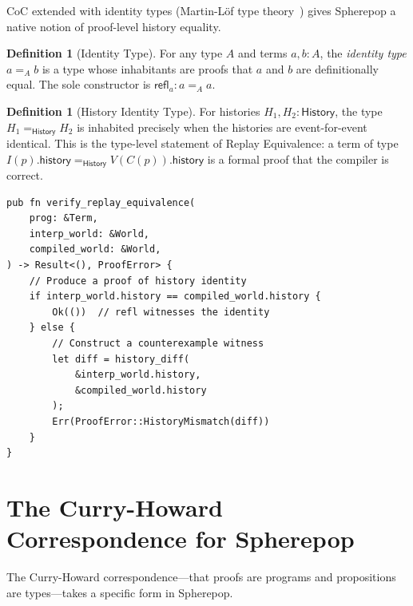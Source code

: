 \documentclass[12pt, a4paper, openany]{book}
\theoremstyle{plain}
\theoremstyle{definition}
\newtheorem{definition}[theorem]{Definition}
\theoremstyle{remark}
\begin{document}
CoC extended with identity types (Martin-L\"of type theory~\cite{martinlof84})
gives Spherepop a native notion of proof-level history equality.

\begin{definition}[Identity Type]
For any type $A$ and terms $a, b : A$, the \emph{identity type} $a =_A b$ is a
type whose inhabitants are proofs that $a$ and $b$ are definitionally equal.
The sole constructor is $\mathsf{refl}_a : a =_A a$.
\end{definition}

\begin{definition}[History Identity Type]
For histories $H_1, H_2 : \mathsf{History}$, the type $H_1 =_{\mathsf{History}} H_2$
is inhabited precisely when the histories are event-for-event identical. This is
the type-level statement of Replay Equivalence: a term of type
$I(p).\mathsf{history} =_{\mathsf{History}} V(C(p)).\mathsf{history}$
is a formal proof that the compiler is correct.
\end{definition}

\begin{lstlisting}[style=rust, caption={History identity in the type system}]
pub fn verify_replay_equivalence(
    prog: &Term,
    interp_world: &World,
    compiled_world: &World,
) -> Result<(), ProofError> {
    // Produce a proof of history identity
    if interp_world.history == compiled_world.history {
        Ok(())  // refl witnesses the identity
    } else {
        // Construct a counterexample witness
        let diff = history_diff(
            &interp_world.history,
            &compiled_world.history
        );
        Err(ProofError::HistoryMismatch(diff))
    }
}
\end{lstlisting}

\section{The Curry-Howard Correspondence for Spherepop}

The Curry-Howard correspondence---that proofs are programs and propositions are
types---takes a specific form in Spherepop.
\end{document}
